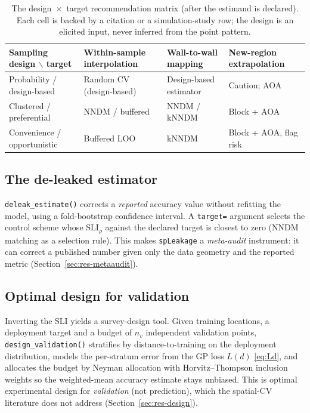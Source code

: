 \documentclass[11pt,a4paper]{article}
\newcommand{\SLI}{\mathrm{SLI}}
\newcommand{\SLIrho}{\SLI_{\rho}}
\begin{document}
\begin{table}[t]
\centering
\caption{The design~$\times$~target recommendation matrix (after the estimand is
declared). Each cell is backed by a citation or a simulation-study row; the design
is an elicited input, never inferred from the point pattern.}
\label{tab:matrix}
\small
\begin{tabular}{p{3.4cm} p{3.0cm} p{3.0cm} p{3.2cm}}
\toprule
\textbf{Sampling design $\backslash$ target} & \textbf{Within-sample
interpolation} & \textbf{Wall-to-wall mapping} & \textbf{New-region
extrapolation}\\
\midrule
Probability / design-based & Random CV (design-based) & Design-based estimator &
Caution; AOA\\
Clustered / preferential & NNDM / buffered & NNDM / kNNDM & Block + AOA\\
Convenience / opportunistic & Buffered LOO & kNNDM & Block + AOA, flag risk\\
\bottomrule
\end{tabular}
\end{table}

\subsection{The de-leaked estimator}

\texttt{deleak\_estimate()} corrects a \emph{reported} accuracy value without
refitting the model, using a fold-bootstrap confidence interval. A
\texttt{target=} argument selects the control scheme whose $\SLIrho$ against the
declared target is closest to zero (NNDM matching as a selection rule). This makes
\texttt{spLeakage} a \emph{meta-audit} instrument: it can correct a published number
given only the data geometry and the reported metric
(Section~\ref{sec:res-metaaudit}).

\subsection{Optimal design for validation}

Inverting the SLI yields a survey-design tool. Given training locations, a
deployment target and a budget of $n_v$ independent validation points,
\texttt{design\_validation()} stratifies by distance-to-training on the deployment
distribution, models the per-stratum error from the GP loss $L(d)$
\eqref{eq:Ld}, and allocates the budget by Neyman allocation with Horvitz--Thompson
inclusion weights so the weighted-mean accuracy estimate stays unbiased. This is
optimal experimental design for \emph{validation} (not prediction), which the
spatial-CV literature does not address (Section~\ref{sec:res-design}).
\end{document}
